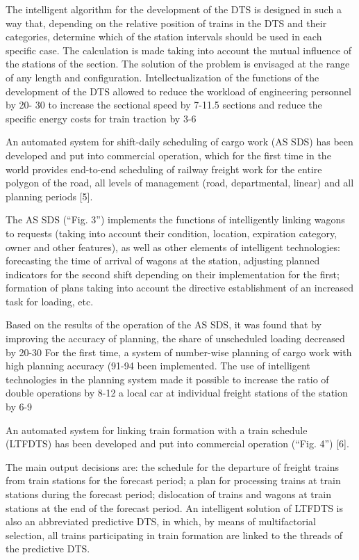 \documentclass{article}
\begin{document}
     
\newpage
\begin{multicols}{2}


 The intelligent algorithm for the development of the
DTS is designed in such a way that, depending on the
relative position of trains in the DTS and their categories,
determine which of the station intervals should be used
in each specific case. The calculation is made taking
into account the mutual influence of the stations of the
section. The solution of the problem is envisaged at the
range of any length and configuration. Intellectualization
of the functions of the development of the DTS allowed
to reduce the workload of engineering personnel by 20-
30%
to increase the sectional speed by 7-11.5%
sections and reduce the specific energy costs for train
traction by 3-6%

 An automated system for shift-daily scheduling of
cargo work (AS SDS) has been developed and put into
commercial operation, which for the first time in the
world provides end-to-end scheduling of railway freight
work for the entire polygon of the road, all levels of
management (road, departmental, linear) and all planning
periods [5].

 The AS SDS (“Fig. 3”) implements the functions
of intelligently linking wagons to requests (taking into
account their condition, location, expiration category,
owner and other features), as well as other elements of
intelligent technologies: forecasting the time of arrival of
wagons at the station, adjusting planned indicators for the
second shift depending on their implementation for the
first; formation of plans taking into account the directive
establishment of an increased task for loading, etc.

 Based on the results of the operation of the AS SDS,
it was found that by improving the accuracy of planning,
the share of unscheduled loading decreased by 20-30%
For the first time, a system of number-wise planning of
cargo work with high planning accuracy (91-94%
been implemented. The use of intelligent technologies in
the planning system made it possible to increase the ratio
of double operations by 8-12%
a local car at individual freight stations of the station by
6-9%

 An automated system for linking train formation with
a train schedule (LTFDTS) has been developed and put
into commercial operation (“Fig. 4”) [6].

 The main output decisions are: the schedule for the
departure of freight trains from train stations for the
forecast period; a plan for processing trains at train
stations during the forecast period; dislocation of trains
and wagons at train stations at the end of the forecast
period. An intelligent solution of LTFDTS is also an
abbreviated predictive DTS, in which, by means of
multifactorial selection, all trains participating in train
formation are linked to the threads of the predictive DTS.


\end{multicols}
\end{document}
